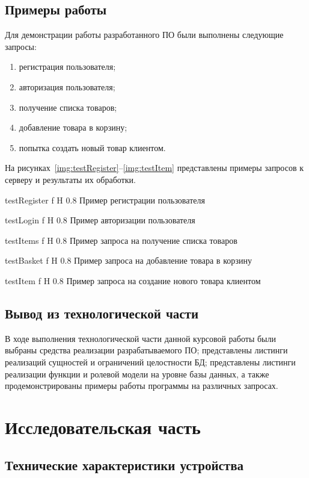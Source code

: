\documentclass{bmstu}
\begin{document}
\section{Примеры работы}

Для демонстрации работы разработанного ПО были выполнены следующие запросы:

\begin{enumerate}
	\item регистрация пользователя;
	\item авторизация пользователя;
	\item получение списка товаров;
	\item добавление товара в корзину;
	\item попытка создать новый товар клиентом.
\end{enumerate}

На рисунках~\ref{img:testRegister}--\ref{img:testItem} представлены примеры запросов к серверу и результаты их обработки.

{testRegister}
{f}
{H}
{0.8\textwidth}
{Пример регистрации пользователя}

{testLogin}
{f}
{H}
{0.8\textwidth}
{Пример авторизации пользователя}

{testItems}
{f}
{H}
{0.8\textwidth}
{Пример запроса на получение списка товаров}

{testBasket}
{f}
{H}
{0.8\textwidth}
{Пример запроса на добавление товара в корзину}

{testItem}
{f}
{H}
{0.8\textwidth}
{Пример запроса на создание нового товара клиентом}


\section*{Вывод из технологической части}

В ходе выполнения технологической части данной курсовой работы были выбраны средства реализации разрабатываемого ПО; представлены листинги реализаций сущностей и ограничений целостности БД; представлены листинги реализации функции и ролевой модели на уровне базы данных, а также продемонстрированы примеры работы программы на различных запросах.

\chapter{Исследовательская часть}

\section{Технические характеристики устройства}
\end{document}
